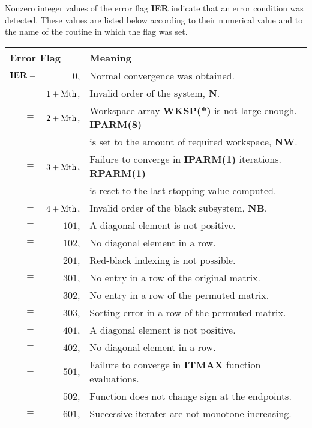 Nonzero integer values of the error flag {\bf IER} indicate that an error
condition was detected.  These values are listed below according to
their numerical value and to the name of the routine in which the flag
was set. 
 
\bigskip
\begin{tabular}{rrl} \hline
  \multicolumn{2}{l}{Error Flag} & Meaning \\ \hline
   ${\bf IER} =$ &  $0$, & Normal convergence was obtained. \\
   $ =$ & $1+{\rm Mth}$, & Invalid order of the system, {\bf N}. \\
   $ =$ & $2+{\rm Mth}$, & Workspace array {\bf WKSP(*)} is not large 
                            enough. {\bf IPARM(8)} \\
        &                & is set to the amount of required workspace, 
                            {\bf NW}. \\
   $ =$ & $3+{\rm Mth}$, & Failure to converge in {\bf IPARM(1)} 
                           iterations. {\bf RPARM(1)} \\
        &                & is reset to the last stopping value computed. \\
   $ =$ & $4+{\rm Mth}$, & Invalid order of the black subsystem, {\bf NB}. \\
   $ =$ & $101$,         & A diagonal element is not positive. \\
   $ =$ & $102$,         & No diagonal element in a row. \\
   $ =$ & $201$,         & Red-black indexing is not possible. \\
   $ =$ & $301$,         & No entry in a row of the original matrix. \\
   $ =$ & $302$,         & No entry in a row of the permuted matrix. \\
   $ =$ & $303$,         & Sorting error in a row of the permuted matrix. \\
   $ =$ & $401$,         & A diagonal element is not positive. \\
   $ =$ & $402$,         & No diagonal element in a row. \\
   $ =$ & $501$,         & Failure to converge in {\bf ITMAX} 
                              function evaluations. \\
   $ =$ & $502$,         & Function does not change sign at the endpoints. \\
   $ =$ & $601$,         & Successive iterates are not monotone increasing. \\
                   \hline
\end{tabular}
\bigskip
 
